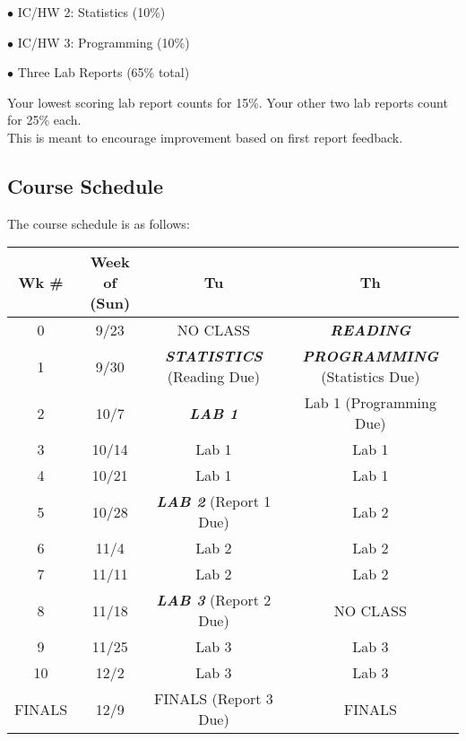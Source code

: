 \documentclass[10pt]{article}
\newcommand{\spfont}[1]{\textit{\textbf{\large #1}}}
\begin{document}
$\bullet$ IC/HW 2: Statistics (10\%)

$\bullet$ IC/HW 3: Programming (10\%)

$\bullet$ Three Lab Reports (65\% total)

\noindent
Your lowest scoring lab report counts for 15\%. Your other two lab reports count for 25\% each. \\ This is meant to encourage improvement based on first report feedback.


\subsection*{Course Schedule}
The course schedule is as follows:

\begin{table}[h]
\centering
\begin{tabular}{|c|c|c|c|}
\hline
\textbf{Wk \#} & \textbf{Week of (Sun)} & \textbf{Tu}              & \textbf{Th}                  \\ \hline
0              & 9/23                   & NO CLASS                 & \spfont{READING}                     \\ \hline
1              & 9/30                   & \spfont{STATISTICS} (Reading Due) & \spfont{PROGRAMMING} (Statistics Due) \\ \hline
2              & 10/7                   & \spfont{LAB 1}                    & Lab 1 (Programming Due)      \\ \hline
3              & 10/14                  & Lab 1                    & Lab 1                        \\ \hline
4              & 10/21                  & Lab 1                    & Lab 1                        \\ \hline
5              & 10/28                  & \spfont{LAB 2} (Report 1 Due)     & Lab 2                        \\ \hline
6              & 11/4                   & Lab 2                    & Lab 2                        \\ \hline
7              & 11/11                  & Lab 2                    & Lab 2                        \\ \hline
8              & 11/18                  & \spfont{LAB 3} (Report 2 Due)     & NO CLASS                     \\ \hline
9              & 11/25                  & Lab 3                    & Lab 3                        \\ \hline
10             & 12/2                   & Lab 3                    & Lab 3                        \\ \hline
FINALS         & 12/9                   & FINALS (Report 3 Due)    & FINALS                       \\ \hline
\end{tabular}
\end{table}
\end{document}
